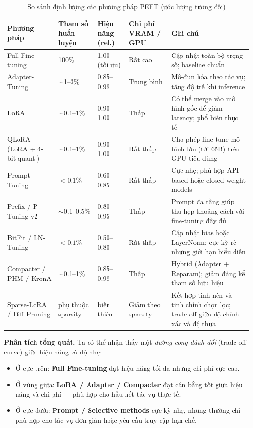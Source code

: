 \begin{table}[H]
	\centering
	\caption{So sánh định lượng các phương pháp PEFT (ước lượng tương đối)}
	\label{tab:peft_compare}
	\begin{tabular}{|p{3.2cm}|p{2cm}|p{2.5cm}|p{2.5cm}|p{5cm}|}
		\hline
		\textbf{Phương pháp} & \textbf{Tham số huấn luyện} & \textbf{Hiệu năng (rel.)} & \textbf{Chi phí VRAM / GPU} & \textbf{Ghi chú} \\ \hline
		Full Fine-tuning & 100\% & 1.00 (tối ưu) & Rất cao & Cập nhật toàn bộ trọng số; baseline chuẩn \\ \hline
		Adapter-Tuning & $\sim$1--3\% & 0.85--0.98 & Trung bình & Mô-đun hóa theo tác vụ; tăng độ trễ khi inference \\ \hline
		LoRA & $\sim$0.1--1\% & 0.90--1.00 & Thấp & Có thể merge vào mô hình gốc để giảm latency; phổ biến thực tế \\ \hline
		QLoRA (LoRA + 4-bit quant.) & $\sim$0.1--1\% & 0.90--1.00 & Rất thấp & Cho phép fine-tune mô hình lớn (tới 65B) trên GPU tiêu dùng \\ \hline
		Prompt-Tuning & $<0.1\%$ & 0.60--0.85 & Rất thấp & Cực nhẹ; phù hợp API-based hoặc closed-weight models \\ \hline
		Prefix / P-Tuning v2 & $\sim$0.1--0.5\% & 0.80--0.95 & Thấp & Prompt đa tầng giúp thu hẹp khoảng cách với fine-tuning đầy đủ \\ \hline
		BitFit / LN-Tuning & $<0.1\%$ & 0.50--0.80 & Rất thấp & Cập nhật bias hoặc LayerNorm; cực kỳ rẻ nhưng giới hạn biểu diễn \\ \hline
		Compacter / PHM / KronA & $\sim$0.1--1\% & 0.85--0.98 & Thấp & Hybrid (Adapter + Reparam); giảm đáng kể tham số hữu hiệu \\ \hline
		Sparse-LoRA / Diff-Pruning & phụ thuộc sparsity & biến thiên & Giảm theo sparsity & Kết hợp tính nén và tinh chỉnh chọn lọc; trade-off giữa độ chính xác và độ thưa \\ \hline
	\end{tabular}
\end{table}

\textbf{Phân tích tổng quát.}  
Ta có thể nhận thấy một \emph{đường cong đánh đổi} (trade-off curve) giữa hiệu năng và độ nhẹ:  
\begin{itemize}
	\item Ở cực trên: \textbf{Full Fine-tuning} đạt hiệu năng tối đa nhưng chi phí cực cao.  
	\item Ở vùng giữa: \textbf{LoRA / Adapter / Compacter} đạt cân bằng tốt giữa hiệu năng và chi phí — phù hợp cho hầu hết tác vụ thực tế.  
	\item Ở cực dưới: \textbf{Prompt / Selective methods} cực kỳ nhẹ, nhưng thường chỉ phù hợp cho tác vụ đơn giản hoặc yêu cầu truy cập hạn chế.  
\end{itemize}

